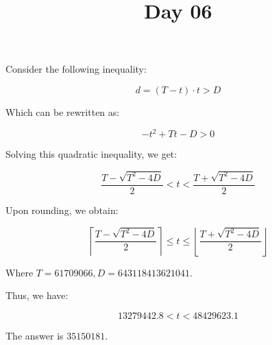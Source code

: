 \documentclass{article}
\begin{document}
\title{Day 06}
\maketitle

Consider the following inequality:

\begin{equation}
d = (T-t) \cdot t > D
\end{equation}

Which can be rewritten as:

\begin{equation}
- t^2 + Tt - D > 0
\end{equation}

Solving this quadratic inequality, we get:

\begin{equation}
\frac{T - \sqrt{T^2 - 4D}}{2} < t < \frac{T + \sqrt{T^2 - 4D}}{2}
\end{equation}

Upon rounding, we obtain:

\begin{equation}
\left \lceil \frac{T - \sqrt{T^2 - 4D}}{2} \right \rceil \leq t \leq \left \lfloor \frac{T + \sqrt{T^2 - 4D}}{2} \right \rfloor
\end{equation}

Where $T = 61709066, D = 643118413621041.$

Thus, we have:

\begin{equation}
13279442.8 < t < 48429623.1
\end{equation}

The answer is $35150181$.
\end{document}
